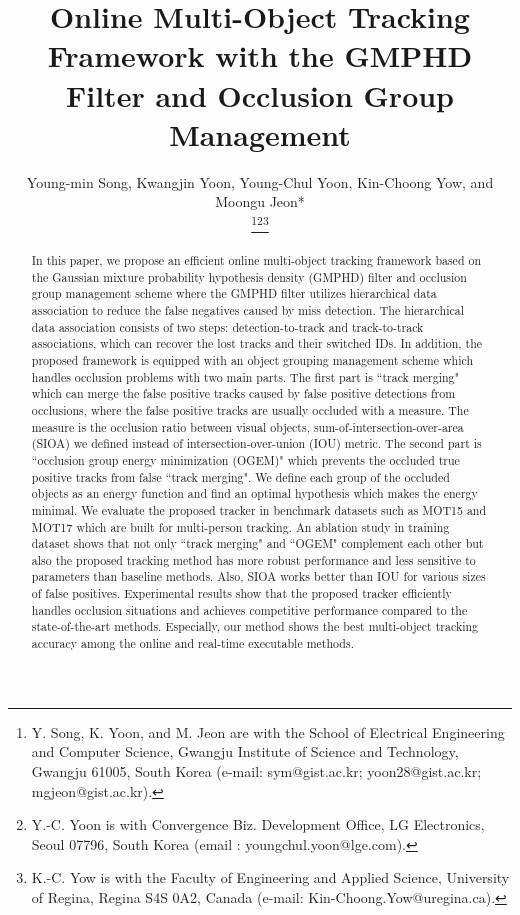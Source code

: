 \documentclass[journal]{IEEEtran}
\newcounter{ct}
\begin{document}
    \title{Online Multi-Object Tracking Framework with the GMPHD Filter and Occlusion Group Management}
  \author{Young-min Song, Kwangjin Yoon, Young-Chul Yoon, Kin-Choong Yow, and Moongu Jeon*

  \thanks{Y. Song, K. Yoon, and M. Jeon are with the School of Electrical Engineering and Computer Science, Gwangju Institute of Science and Technology, Gwangju 61005, South Korea (e-mail: sym@gist.ac.kr; yoon28@gist.ac.kr; mgjeon@gist.ac.kr).}\thanks{Y.-C. Yoon is with Convergence Biz. Development Office, LG Electronics, Seoul 07796, South Korea (email : youngchul.yoon@lge.com).}\thanks{K.-C. Yow is with the Faculty of Engineering and Applied Science, University of Regina, Regina S4S 0A2, Canada (e-mail: Kin-Choong.Yow@uregina.ca).}}  





\maketitle



\begin{abstract}
In this paper, we propose an efficient online multi-object tracking framework based on the Gaussian mixture probability hypothesis density (GMPHD) filter and occlusion group management scheme where the GMPHD filter utilizes hierarchical data association to reduce the false negatives caused by miss detection. The hierarchical data association consists of two steps: detection-to-track and track-to-track associations, which can recover the lost tracks and their switched IDs. 
In addition, the proposed framework is equipped with an object grouping management scheme which handles occlusion problems with two main parts. The first part is ``track merging" which can merge the false positive tracks caused by false positive detections from occlusions, where the false positive tracks are usually occluded with a measure. The measure is the occlusion ratio between visual objects, sum-of-intersection-over-area (SIOA) we defined instead of intersection-over-union (IOU) metric. 
The second part is ``occlusion group energy minimization (OGEM)" which prevents the occluded true positive tracks from false ``track merging". We define each group of the occluded objects as an energy function and find an optimal hypothesis which makes the energy minimal.
We evaluate the proposed tracker in benchmark datasets such as MOT15 and MOT17 which are built for multi-person tracking. An ablation study in training dataset shows that not only ``track merging" and ``OGEM" complement each other but also the proposed tracking method has more robust performance and less sensitive to parameters than baseline methods. Also, SIOA works better than IOU for various sizes of false positives. Experimental results show that the proposed tracker efficiently handles occlusion situations and achieves competitive performance compared to the state-of-the-art methods. Especially, our method shows the best multi-object tracking accuracy among the online and real-time executable methods. \end{abstract}
\end{document}
